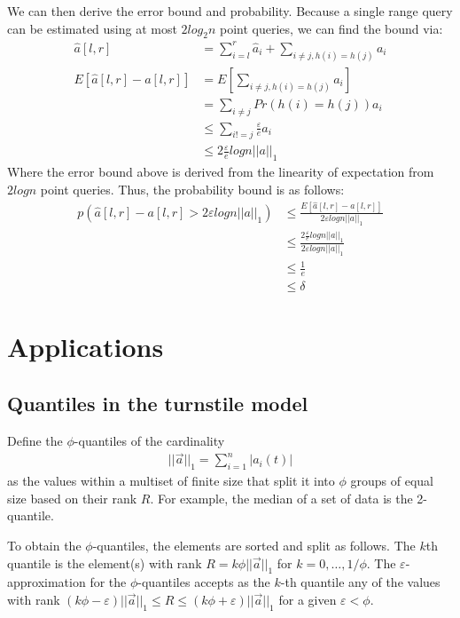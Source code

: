 \documentclass[11pt]{article}
\begin{document}
{    We can then derive the error bound and probability. Because a single range query can be estimated using at most $2log_2n$ point queries, we can find the bound via:
\begin{align*}
    \hat a[l,r] &= \sum_{i = l}^r \hat a_i + \sum_{i \neq j, h(i)=h(j)} a_i\\
    E[\hat a[l,r] - a[l,r]] &= E[\sum_{i \neq j, h(i)=h(j)} a_i]\\
    &= \sum_{i \neq j}Pr(h(i) = h(j)) a_i\\
    &\leq \sum_{i!=j} \frac{\varepsilon}{e} a_i\\
    &\leq 2\frac{\varepsilon}{e} logn ||a||_1
\end{align*}
Where the error bound above is derived from the linearity of expectation from $2logn$ point queries. Thus, the probability bound is as follows:
\begin{align*}
    p(\hat a[l,r] - a[l,r] > 2\varepsilon logn ||a||_1) &\leq \frac{E[\hat a[l,r] - a[l,r]]}{2\varepsilon logn||a||_1}\\
    &\leq \frac{2\frac{\varepsilon}{e}logn ||a||_1}{2\varepsilon logn ||a||_1}\\
    &\leq \frac{1}{e}\\
    &\leq \delta
\end{align*}
\section{Applications}

\subsection{Quantiles in the turnstile model}
Define the $\phi$-quantiles of the cardinality
\begin{align}
    ||\vec{a}||_1 = \sum_{i = 1}^{n}|a_i(t)|
\end{align}
as the values within a multiset of finite size that split it into $\phi$ groups
of equal size based on their rank $R$.  For example, the median of a set of data
is the 2-quantile. 

To obtain the $\phi$-quantiles, the elements are sorted and split as follows.
The $k$th quantile is the element(s) with rank $R = k\phi||\vec{a}||_1$ for $k =
0, \dots, 1/\phi$.  The $\varepsilon$-approximation for the $\phi$-quantiles
accepts as the $k$-th quantile any of the  values with rank $(k\phi -
\varepsilon)||\vec{a}||_1 \leq R \leq (k\phi + \varepsilon)||\vec{a}||_1$ for a
given $\varepsilon < \phi$.


}
\end{document}
